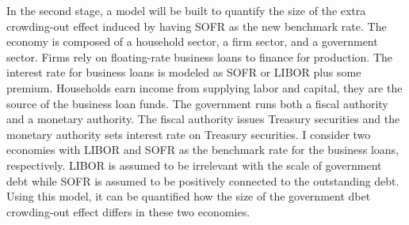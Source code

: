 \documentclass[12pt]{article}
\newcommand{\tab}{\hspace*{2em}} %
\begin{document}
\tab In the second stage,  a model will be built to quantify the size of the extra crowding-out effect induced by having SOFR as the new benchmark rate.  The economy is composed of a household sector,  a firm sector,  and a government sector.  Firms rely on floating-rate business loans to finance for production.  The interest rate for business loans is modeled as SOFR or LIBOR plus some premium.  Households earn income from supplying labor and capital,  they are the source of the business loan funds.  The government runs both a fiscal authority and a monetary authority.  The fiscal authority issues Treasury securities and the monetary authority sets interest rate on Treasury securities.  I consider two economies with LIBOR and SOFR as the benchmark rate for the business loans,  respectively.  LIBOR is assumed to be irrelevant with the scale of government debt while SOFR is assumed to be positively connected to the outstanding debt.  Using this model,  it can be quantified how the size of the government dbet crowding-out effect differs in these two economies.
 
 
 
 
 
 
 
 
 
 
\end{document}
